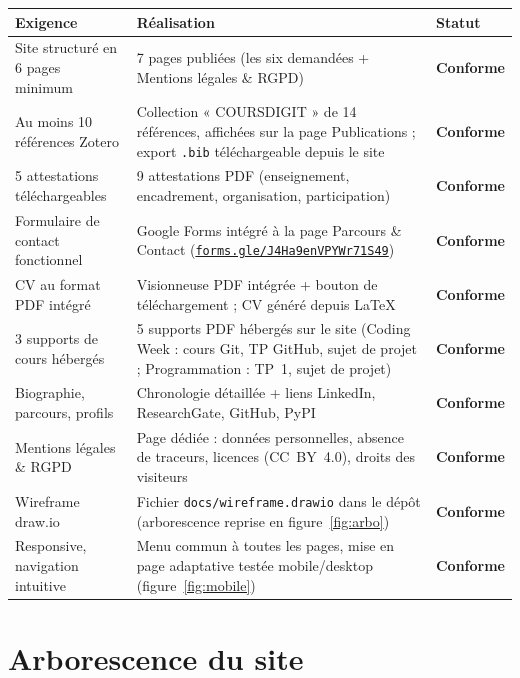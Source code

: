 \documentclass[11pt,a4paper]{article}
\newcommand{\ok}{\textcolor{primary}{\bfseries Conforme}}
\begin{document}
\begin{center}
  \renewcommand{\arraystretch}{1.35}
  \small
  \begin{tabular}{p{5.6cm}p{6.6cm}l}
    \toprule
    \textbf{Exigence} & \textbf{Réalisation} & \textbf{Statut} \\
    \midrule
    Site structuré en 6 pages minimum & 7 pages publiées (les six demandées +
      Mentions légales \& RGPD) & \ok \\
    Au moins 10 références Zotero & Collection « COURSDIGIT » de 14 références,
      affichées sur la page Publications ; export \texttt{.bib} téléchargeable
      depuis le site & \ok \\
    5 attestations téléchargeables & 9 attestations PDF (enseignement,
      encadrement, organisation, participation) & \ok \\
    Formulaire de contact fonctionnel & Google Forms intégré à la page
      Parcours \& Contact
      (\href{https://forms.gle/J4Ha9enVPYWr71S49}{\texttt{forms.gle/J4Ha9enVPYWr71S49}}) & \ok \\
    CV au format PDF intégré & Visionneuse PDF intégrée + bouton de
      téléchargement ; CV généré depuis LaTeX & \ok \\
    3 supports de cours hébergés & 5 supports PDF hébergés sur le site
      (Coding Week : cours Git, TP GitHub, sujet de projet ; Programmation :
      TP~1, sujet de projet) & \ok \\
    Biographie, parcours, profils & Chronologie détaillée + liens LinkedIn,
      ResearchGate, GitHub, PyPI & \ok \\
    Mentions légales \& RGPD & Page dédiée : données personnelles, absence de
      traceurs, licences (CC~BY~4.0), droits des visiteurs & \ok \\
    Wireframe draw.io & Fichier \texttt{docs/wireframe.drawio} dans le dépôt
      (arborescence reprise en figure~\ref{fig:arbo}) & \ok \\
    Responsive, navigation intuitive & Menu commun à toutes les pages, mise en
      page adaptative testée mobile/desktop (figure~\ref{fig:mobile}) & \ok \\
    \bottomrule
  \end{tabular}
\end{center}

\section{Arborescence du site}
\end{document}
